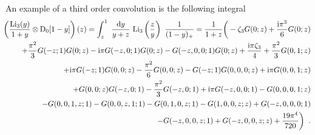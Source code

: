 \documentclass[12pt]{article}
\DeclareRobustCommand{\nn}{\nonumber}
\def\beeq{\begin{eqnarray}}
\def\eeeq{\end{eqnarray}}
\DeclareRobustCommand{\rd}{\ensuremath{\mathrm{d}}}
\DeclareRobustCommand{\ri}{\ensuremath{\mathrm{i}}\xspace}
\begin{document}
\begin{appendix}
An example of a third order convolution is the following integral
\beeq\label{Convoexamp}
   &&\!\!\!\!\!\!\!\!\left(\frac{{\rm Li}_{3}( y) }{1+y}\otimes  {\rm D}_{0}[1-y]\right)(z) = \int^{1}_{z}~\frac{\rd y}{y+z}~{\rm Li}_{3}\left(\frac{z}{y}\right)~\frac{1}{(1-y)_{+}}  =\frac{1}{1+z}\bigg(-  \zeta_{3} G(0;z)+\frac{\ri \pi ^3 }{6 }G(0;z)\nn\\
   &&\!\!\!\!\!\!\!\!\!\!+\frac{\pi ^2}{3}G(-z;1) G(0;z)- \ri \pi  G(-z,0;1)G(0;z)-G(-z,0,0;1) G(0;z)+\frac{\ri\pi  \zeta_{3}}{4}+\frac{\pi ^2 }{3 }G(0,1;z)\nn\\
   &&\!\!\!\!\!\!\!\!\!\! +\ri \pi  G(-z;1) G(0,0;z)-\frac{\pi ^2 }{6 }G(0,0;z)-G(-z;1) G(0,0,0;z)+\ri \pi G(0,0,1;z)\nn\\
   &&\!\!\!\!\!\!\!\!\!\! +G(0,0;z)G(-z,0;1)-\frac{\pi ^2 }{3}G(-z,0;1)+\ri \pi G(-z,0,0;1)-G(0,0,0,1;z)\nn\\
   &&\!\!\!\!\!\!\!\!\!\!-G(0,0,1,z;1)-G(0,0,z,1;1)-G(0,1,0,z;1)-G(1,0,0,z;z)+G(-z,0,0,0;1)\nn\\
   &&\!\!\!\!\!\!\!\!\!\!-G(-z,0,0,z;1)+G(-z,0,0,z;z) +\frac{19 \pi ^4}{720 }\bigg)\;\;.
\eeeq


\end{appendix}
\end{document}
